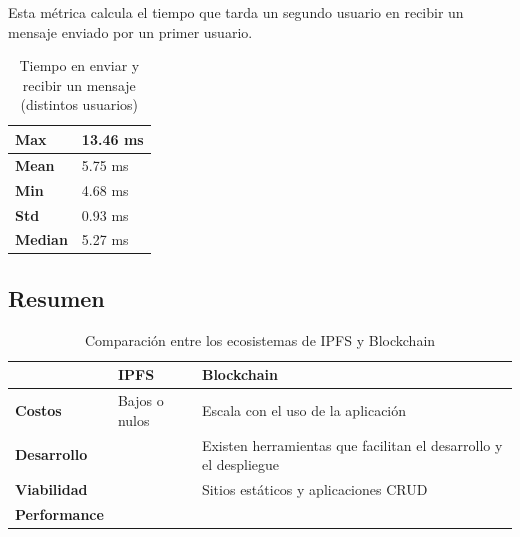 Esta métrica calcula el tiempo que tarda un segundo usuario en recibir un mensaje enviado por un primer usuario.

\setlength\tabcolsep{1pt}
\begin{table}[!htbp]
    \centering
    \begin{tabular}{|m{5em}|m{5em}|}
    \hline
    \textbf{Max} & 13.46 ms \\
    \hline
    \textbf{Mean} & 5.75 ms \\
    \hline
    \textbf{Min} & 4.68 ms \\
    \hline
    \textbf{Std} & 0.93 ms \\
    \hline
    \textbf{Median} & 5.27 ms \\
    \hline
    \end{tabular}
    \caption{Tiempo en enviar y recibir un mensaje (distintos usuarios)}
\end{table}

\subsection{Resumen}

\setlength\tabcolsep{1pt}
\begin{table}[H]
    \centering
    \begin{tabular}{||m{7em}|m{14em}|m{14em}||}
    \hline
     & \textbf{IPFS} & \textbf{Blockchain} \\
    \hline\hline
    \textbf{Costos} & Bajos o nulos & Escala con el uso de la aplicación \\
    \hline
    \textbf{Desarrollo} &  & Existen herramientas que facilitan el desarrollo y el despliegue \\
    \hline
    \textbf{Viabilidad} & & Sitios estáticos y aplicaciones CRUD \\
    \hline
    \textbf{Performance} & & \\
    \hline
    \end{tabular}
    \caption{Comparación entre los ecosistemas de IPFS y Blockchain}
\end{table}

